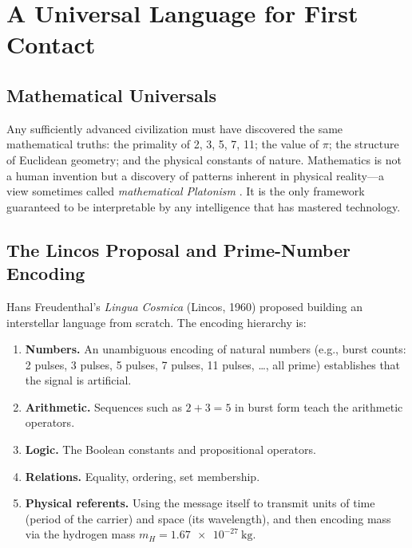 \documentclass[12pt,a4paper]{article}
\begin{document}
\section{A Universal Language for First Contact}

\subsection{Mathematical Universals}

Any sufficiently advanced civilization must have discovered the same
mathematical truths: the primality of 2, 3, 5, 7, 11; the value of $\pi$;
the structure of Euclidean geometry; and the physical constants of nature.
Mathematics is not a human invention but a discovery of patterns inherent in
physical reality---a view sometimes called \emph{mathematical Platonism}
\citep{Penrose1989}. It is the only framework guaranteed to be interpretable
by any intelligence that has mastered technology.

\subsection{The Lincos Proposal and Prime-Number Encoding}

Hans Freudenthal's \emph{Lingua Cosmica} (Lincos, 1960) \citep{Freudenthal1960}
proposed building an interstellar language from scratch. The encoding
hierarchy is:
\begin{enumerate}[noitemsep]
  \item \textbf{Numbers.} An unambiguous encoding of natural numbers (e.g., burst
    counts: 2 pulses, 3 pulses, 5 pulses, 7 pulses, 11 pulses, \ldots, all prime)
    establishes that the signal is artificial.
  \item \textbf{Arithmetic.} Sequences such as $2 + 3 = 5$ in burst form teach
    the arithmetic operators.
  \item \textbf{Logic.} The Boolean constants and propositional operators.
  \item \textbf{Relations.} Equality, ordering, set membership.
  \item \textbf{Physical referents.} Using the message itself to transmit
    units of time (period of the carrier) and space (its wavelength), and then
    encoding mass via the hydrogen mass \mbox{$m_H = \SI{1.67e-27}{\kilo\gram}$}.
\end{enumerate}
\end{document}
